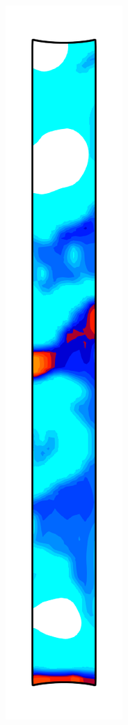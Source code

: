 \begin{figure}[!htb]
\begin{subfigure}{0.08\textwidth}
  \end{subfigure}
  \begin{subfigure}{0.08\textwidth}
    \centering
    \includegraphics[width=\textwidth]{Chapter5/figures/spallation/c_6}

\end{subfigure}
\end{figure}
